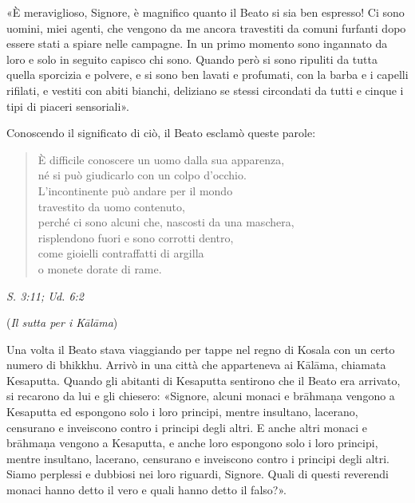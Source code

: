 «È meraviglioso, Signore, è magnifico quanto il Beato si sia ben
espresso! Ci sono uomini, miei agenti, che vengono da me ancora
travestiti da comuni furfanti dopo essere stati a spiare nelle campagne.
In un primo momento sono ingannato da loro e solo in seguito capisco chi
sono. Quando però si sono ripuliti da tutta quella sporcizia e polvere,
e si sono ben lavati e profumati, con la barba e i capelli rifilati, e
vestiti con abiti bianchi, deliziano se stessi circondati da tutti e
cinque i tipi di piaceri sensoriali».


Conoscendo il significato di ciò, il Beato esclamò queste parole:


\begin{quotation}
È difficile conoscere un uomo dalla sua apparenza, \\
né si può giudicarlo con un colpo d’occhio. \\
L’incontinente può andare per il mondo \\
travestito da uomo contenuto, \\
perché ci sono alcuni che, nascosti da una maschera, \\
risplendono fuori e sono corrotti dentro, \\
come gioielli contraffatti di argilla \\
o monete dorate di rame.
\end{quotation}

\emph{S. 3:11; Ud. 6:2}


(\emph{Il sutta per i Kālāma})


Una volta il Beato stava viaggiando per tappe nel regno di Kosala con un
certo numero di bhikkhu. Arrivò in una città che apparteneva ai Kālāma,
chiamata Kesaputta. Quando gli abitanti di Kesaputta sentirono che il
Beato era arrivato, si recarono da lui e gli chiesero: «Signore, alcuni
monaci e brāhmaṇa vengono a Kesaputta ed espongono solo i loro principi,
mentre insultano, lacerano, censurano e inveiscono contro i principi
degli altri. E anche altri monaci e brāhmaṇa vengono a Kesaputta, e
anche loro espongono solo i loro principi, mentre insultano, lacerano,
censurano e inveiscono contro i principi degli altri. Siamo perplessi e
dubbiosi nei loro riguardi, Signore. Quali di questi reverendi monaci
hanno detto il vero e quali hanno detto il falso?».



